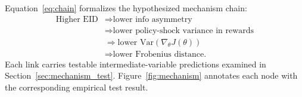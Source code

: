 \documentclass[12pt]{article}
\begin{document}
Equation~\ref{eq:chain} formalizes the hypothesized mechanism chain:
\begin{equation}
\begin{aligned}
\text{Higher EID}
&\Rightarrow \text{lower info asymmetry} \\
&\Rightarrow \text{lower policy-shock variance in rewards} \\
&\Rightarrow \text{lower }\mathrm{Var}(\nabla_\theta J(\theta)) \\
&\Rightarrow \text{lower Frobenius distance.}
\end{aligned}
\label{eq:chain}
\end{equation}
Each link carries testable intermediate-variable predictions examined in Section~\ref{sec:mechanism_test}. Figure~\ref{fig:mechanism} annotates each node with the corresponding empirical test result.
\end{document}
